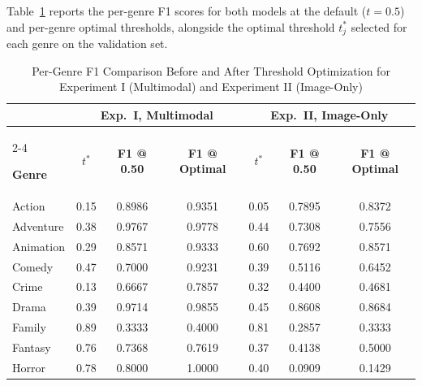 \documentclass[conference]{IEEEtran}
\begin{document}
Table~\ref{tab:threshold_comparison} reports the per-genre F1 scores
for both models at the default ($t = 0.5$) and per-genre optimal
thresholds, alongside the optimal threshold $t^{*}_{j}$ selected for
each genre on the validation set.

\begin{table}[!t]
\caption{Per-Genre F1 Comparison Before and After Threshold Optimization for Experiment I (Multimodal) and Experiment II (Image-Only)}
\label{tab:threshold_comparison}
\begin{center}
\small
\renewcommand{\arraystretch}{1.10}
\setlength{\tabcolsep}{4.5pt}

\begin{tabular}{l c c c c c c}
\hline

& \multicolumn{3}{c}{\textbf{Exp.\ I, Multimodal}}
& \multicolumn{3}{c}{\textbf{Exp.\ II, Image-Only}} \\

\cline{2-4} \cline{5-7}

\textbf{Genre}
& \textbf{$t^{*}$}
& \textbf{F1 @ 0.50}
& \textbf{F1 @ Optimal}

& \textbf{$t^{*}$}
& \textbf{F1 @ 0.50}
& \textbf{F1 @ Optimal} \\

\hline

Action
& 0.15 & 0.8986 & 0.9351
& 0.05 & 0.7895 & 0.8372 \\

Adventure
& 0.38 & 0.9767 & 0.9778
& 0.44 & 0.7308 & 0.7556 \\

Animation
& 0.29 & 0.8571 & 0.9333
& 0.60 & 0.7692 & 0.8571 \\

Comedy
& 0.47 & 0.7000 & 0.9231
& 0.39 & 0.5116 & 0.6452 \\

Crime
& 0.13 & 0.6667 & 0.7857
& 0.32 & 0.4400 & 0.4681 \\

Drama
& 0.39 & 0.9714 & 0.9855
& 0.45 & 0.8608 & 0.8684 \\

Family
& 0.89 & 0.3333 & 0.4000
& 0.81 & 0.2857 & 0.3333 \\

Fantasy
& 0.76 & 0.7368 & 0.7619
& 0.37 & 0.4138 & 0.5000 \\

Horror
& 0.78 & 0.8000 & 1.0000
& 0.40 & 0.0909 & 0.1429 \\


\end{tabular}
\end{center}
\end{table}
\end{document}

